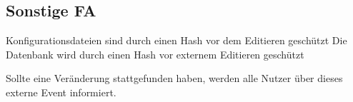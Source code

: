 \subsection{Sonstige FA}
    \begin{requirements}
         Konfigurationsdateien sind durch einen Hash vor dem Editieren geschützt
         Die Datenbank wird durch einen Hash vor externem Editieren geschützt
        \begin{requirements}
             Sollte eine Veränderung stattgefunden haben, werden alle Nutzer über dieses externe Event informiert.
        \end{requirements}
    \end{requirements}


